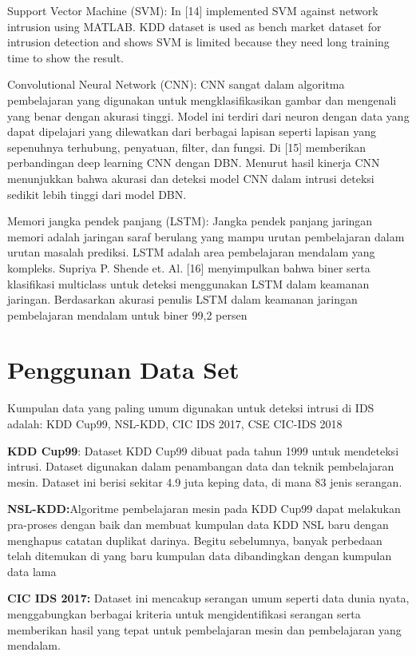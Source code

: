 \documentclass[conference]{IEEEtran}
\begin{document}
Support Vector Machine (SVM): In [14]\cite{sukumar2018network} implemented 
SVM against network intrusion using MATLAB. KDD 
dataset is used as bench market dataset for intrusion 
detection and shows SVM is limited because they need long 
training time to show the result. 

Convolutional Neural Network (CNN): CNN sangat dalam
algoritma pembelajaran yang digunakan untuk mengklasifikasikan gambar dan mengenali
yang benar dengan akurasi tinggi. Model ini terdiri dari
neuron dengan data yang dapat dipelajari yang dilewatkan dari berbagai lapisan
seperti lapisan yang sepenuhnya terhubung, penyatuan, filter, dan fungsi. Di
[15]\cite{lahre2013analyze} memberikan perbandingan deep learning CNN dengan DBN.
Menurut hasil kinerja CNN menunjukkan bahwa
akurasi dan deteksi model CNN dalam intrusi
deteksi sedikit lebih tinggi dari model DBN.

Memori jangka pendek panjang (LSTM): Jangka pendek panjang
jaringan memori adalah jaringan saraf berulang yang mampu
urutan pembelajaran dalam urutan masalah prediksi. LSTM adalah
area pembelajaran mendalam yang kompleks. Supriya P. Shende et. Al. [16]\cite{yong2019intrusion}
menyimpulkan bahwa biner serta klasifikasi multiclass
untuk deteksi menggunakan LSTM dalam keamanan jaringan. Berdasarkan
akurasi penulis LSTM dalam keamanan jaringan pembelajaran mendalam
untuk biner 99,2 persen

\section{Penggunan Data Set}
Kumpulan data yang paling umum digunakan untuk deteksi intrusi
di IDS adalah: KDD Cup99, NSL-KDD, CIC IDS 2017, CSE CIC-IDS 2018

\textbf{KDD Cup99}: Dataset KDD Cup99 dibuat pada tahun 1999
untuk mendeteksi intrusi. Dataset digunakan dalam penambangan data dan
teknik pembelajaran mesin. Dataset ini berisi sekitar 4.9
juta keping data, di mana 83%
jenis serangan.

\textbf{NSL-KDD:}Algoritme pembelajaran mesin pada KDD Cup99 dapat melakukan pra-proses dengan baik dan membuat kumpulan data KDD NSL baru dengan menghapus catatan duplikat darinya. Begitu
sebelumnya, banyak perbedaan telah ditemukan di yang baru
kumpulan data dibandingkan dengan kumpulan data lama


\textbf{CIC IDS 2017:} Dataset ini mencakup serangan umum seperti
data dunia nyata, menggabungkan berbagai kriteria untuk mengidentifikasi serangan serta memberikan hasil yang tepat untuk pembelajaran mesin
dan pembelajaran yang mendalam.
\end{document}
